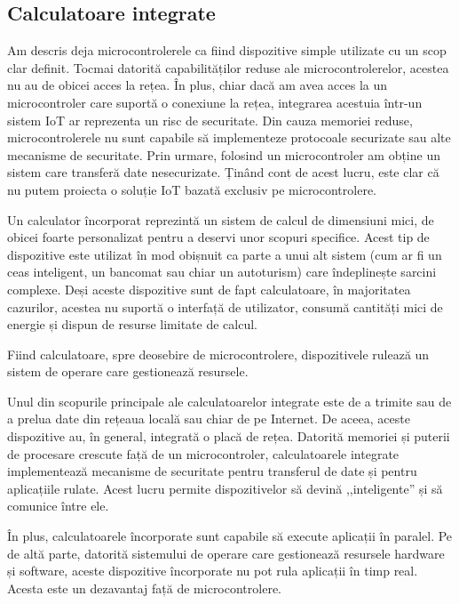 \subsection{Calculatoare integrate}
\label{sec:embed:micro-comp:embed}

Am descris deja microcontrolerele ca fiind dispozitive simple utilizate cu un scop clar definit.
Tocmai datorită capabilităților reduse ale microcontrolerelor, acestea nu au de obicei acces la rețea.
În plus, chiar dacă am avea acces la un microcontroler care suportă o conexiune la rețea, integrarea acestuia într-un sistem IoT ar reprezenta un risc de securitate.
Din cauza memoriei reduse, microcontrolerele nu sunt capabile să implementeze protocoale securizate sau alte mecanisme de securitate.
Prin urmare, folosind un microcontroler am obține un sistem care transferă date nesecurizate.
Ținând cont de acest lucru, este clar că nu putem proiecta o soluție IoT bazată exclusiv pe microcontrolere.

Un calculator încorporat reprezintă un sistem de calcul de dimensiuni mici, de obicei foarte personalizat pentru a deservi unor scopuri specifice.
Acest tip de dispozitive este utilizat în mod obișnuit ca parte a unui alt sistem (cum ar fi un ceas inteligent, un bancomat sau chiar un autoturism) care îndeplinește sarcini complexe.
Deși aceste dispozitive sunt de fapt calculatoare, în majoritatea cazurilor, acestea nu suportă o interfață de utilizator, consumă cantități mici de energie și dispun de resurse limitate de calcul.

Fiind calculatoare, spre deosebire de microcontrolere, dispozitivele rulează un sistem de operare care gestionează resursele.

Unul din scopurile principale ale calculatoarelor integrate este de a trimite sau de a prelua date din rețeaua locală sau chiar de pe Internet.
De aceea, aceste dispozitive au, în general, integrată o placă de rețea.
Datorită memoriei și puterii de procesare crescute față de un microcontroler, calculatoarele integrate implementează mecanisme de securitate pentru transferul de date și pentru aplicațiile rulate.
Acest lucru permite dispozitivelor să devină ,,inteligente'' și să comunice între ele.

În plus, calculatoarele încorporate sunt capabile să execute aplicații în paralel.
Pe de altă parte, datorită sistemului de operare care gestionează resursele hardware și software, aceste dispozitive încorporate nu pot rula aplicații în timp real.
Acesta este un dezavantaj față de microcontrolere.

